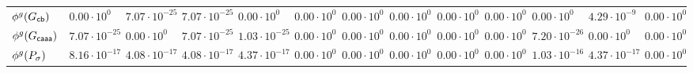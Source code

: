\begin{table}[!t]
{\begin{tabular}{lllllllllllll}
		$\phi^{g}(G_{\mathsf{cb}})$   & $0.00\cdot 10^{0}$   & $7.07\cdot 10^{-25}$ & $7.07\cdot 10^{-25}$ & $0.00\cdot 10^{0}$   & $0.00\cdot 10^{0}$& $0.00\cdot 10^{0}$& $0.00\cdot 10^{0}$& $0.00\cdot 10^{0}$& $0.00\cdot 10^{0}$    &$0.00\cdot 10^{0}$ & $4.29\cdot 10^{-9}$& $0.00\cdot 10^{0}$ \\
		$\phi^{g}(G_{\mathsf{caaa}})$ & $7.07\cdot 10^{-25}$ & $0.00\cdot 10^{0}$   & $7.07\cdot 10^{-25}$ & $1.03\cdot 10^{-25}$ & $0.00\cdot 10^{0}$& $0.00\cdot 10^{0}$& $0.00\cdot 10^{0}$& $0.00\cdot 10^{0}$& $0.00\cdot 10^{0}$    &$7.20\cdot 10^{-26}$ & $0.00\cdot 10^{0}$& $0.00\cdot 10^{0}$ \\
		\bottomrule
				$\phi^{g}(P_{\sigma})$ & $8.16\cdot10^{-17}$ & $4.08\cdot 10^{-17}$ & $4.08\cdot10^{-17}$ & $4.37\cdot 10^{-17}$ &  $0.00\cdot 10^{0}$& $0.00\cdot 10^{0}$& $0.00\cdot 10^{0}$ & $0.00\cdot 10^{0}$ & $0.00\cdot 10^{0}$    & $1.03\cdot10^{-16}$ & $4.37\cdot10^{-17}$& $0.00\cdot 10^{0}$ \\
		\bottomrule
	\end{tabular}}
\end{table}
